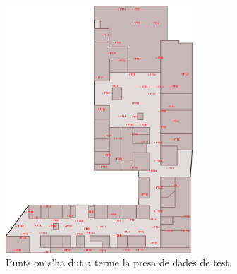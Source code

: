 \begin{figure}[ht]
\begin{center}
\includegraphics[width=7cm]{imatges/planol_test.png}
\caption{Punts on s'ha dut a terme la presa de dades de test.}
\label{fig:planol_test}
\end{center}
\end{figure}
